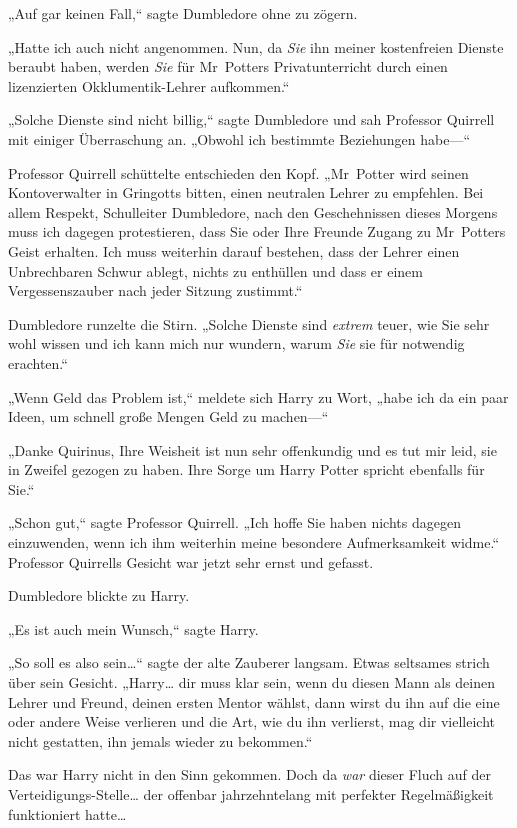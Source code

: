 {„Auf gar keinen Fall,“ sagte Dumbledore ohne zu zögern.

„Hatte ich auch nicht angenommen. Nun, da \emph{Sie} ihn meiner kostenfreien Dienste beraubt haben, werden \emph{Sie} für Mr~Potters Privatunterricht durch einen lizenzierten Okklumentik-Lehrer aufkommen.“

„Solche Dienste sind nicht billig,“ sagte Dumbledore und sah Professor Quirrell mit einiger Überraschung an. „Obwohl ich bestimmte Beziehungen habe—“

Professor Quirrell schüttelte entschieden den Kopf. „Mr~Potter wird seinen Kontoverwalter in Gringotts bitten, einen neutralen Lehrer zu empfehlen. Bei allem Respekt, Schulleiter Dumbledore, nach den Geschehnissen dieses Morgens muss ich dagegen protestieren, dass Sie oder Ihre Freunde Zugang zu Mr~Potters Geist erhalten. Ich muss weiterhin darauf bestehen, dass der Lehrer einen Unbrechbaren Schwur ablegt, nichts zu enthüllen und dass er einem Vergessenszauber nach jeder Sitzung zustimmt.“

Dumbledore runzelte die Stirn. „Solche Dienste sind \emph{extrem} teuer, wie Sie sehr wohl wissen und ich kann mich nur wundern, warum \emph{Sie} sie für notwendig erachten.“

„Wenn Geld das Problem ist,“ meldete sich Harry zu Wort, „habe ich da ein paar Ideen, um schnell große Mengen Geld zu machen—“

„Danke Quirinus, Ihre Weisheit ist nun sehr offenkundig und es tut mir leid, sie in Zweifel gezogen zu haben. Ihre Sorge um Harry Potter spricht ebenfalls für Sie.“

„Schon gut,“ sagte Professor Quirrell. „Ich hoffe Sie haben nichts dagegen einzuwenden, wenn ich ihm weiterhin meine besondere Aufmerksamkeit widme.“ Professor Quirrells Gesicht war jetzt sehr ernst und gefasst.

Dumbledore blickte zu Harry.

„Es ist auch mein Wunsch,“ sagte Harry.

„So soll es also sein…“ sagte der alte Zauberer langsam. Etwas seltsames strich über sein Gesicht. „Harry… dir muss klar sein, wenn du diesen Mann als deinen Lehrer und Freund, deinen ersten Mentor wählst, dann wirst du ihn auf die eine oder andere Weise verlieren und die Art, wie du ihn verlierst, mag dir vielleicht nicht gestatten, ihn jemals wieder zu bekommen.“

Das war Harry nicht in den Sinn gekommen. Doch da \emph{war} dieser Fluch auf der Verteidigungs-Stelle… der offenbar jahrzehntelang mit perfekter Regelmäßigkeit funktioniert hatte…

}
